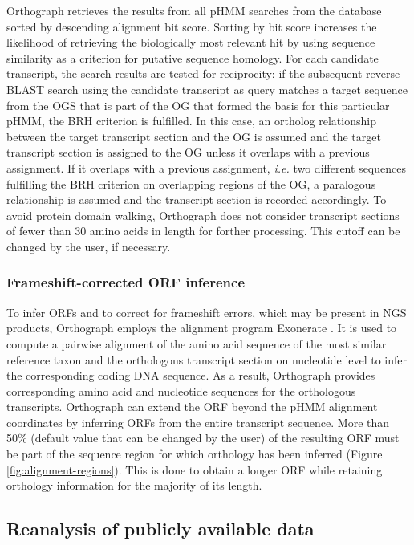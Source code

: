 Orthograph retrieves the results from all pHMM searches from the
database sorted by descending alignment bit score. Sorting by bit score
increases the likelihood of retrieving the biologically most relevant
hit by using sequence similarity as a criterion for putative sequence
homology. For each candidate transcript, the search results are tested
for reciprocity: if the subsequent reverse BLAST search using the
candidate transcript as query matches a target sequence from the OGS
that is part of the OG that formed the basis for this particular pHMM,
the BRH criterion is fulfilled. In this case, an ortholog relationship
between the target transcript section and the OG is assumed and the
target transcript section is assigned to the OG unless it overlaps with
a previous assignment. If it overlaps with a previous assignment,
\emph{i.e.} two different sequences fulfilling the BRH criterion on
overlapping regions of the OG, a paralogous relationship is assumed and
the transcript section is recorded accordingly. To avoid protein domain
walking, Orthograph does not consider transcript sections of fewer than
30 amino acids in length for forther processing. This cutoff can be
changed by the user, if necessary.

\subsubsection{Frameshift-corrected ORF
inference}

To infer ORFs and to correct for frameshift errors, which may be present
in NGS products, Orthograph employs the alignment program Exonerate
\citep{Slater2005}. It is used to compute a pairwise alignment of the
amino acid sequence of the most similar reference taxon and the
orthologous transcript section on nucleotide level to infer the
corresponding coding DNA sequence. As a result, Orthograph provides
corresponding amino acid and nucleotide sequences for the orthologous
transcripts. Orthograph can extend the ORF beyond the pHMM alignment
coordinates by inferring ORFs from the entire transcript sequence. More
than 50\% (default value that can be changed by the user) of the
resulting ORF must be part of the sequence region for which orthology
has been inferred (Figure \ref{fig:alignment-regions}). This is done to obtain a longer ORF while
retaining orthology information for the majority of its length.

\subsection{Reanalysis of publicly available
data}

